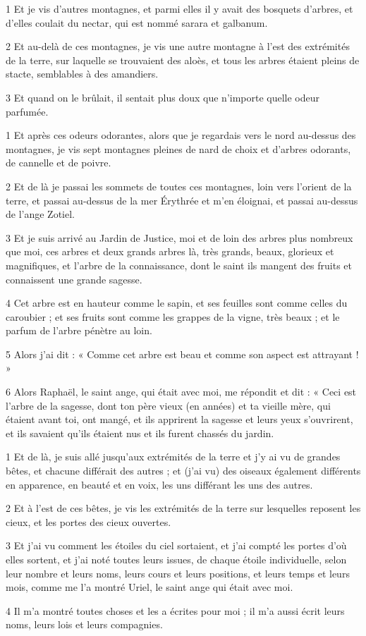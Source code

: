 
\par 1 Et je vis d'autres montagnes, et parmi elles il y avait des bosquets d'arbres, et d'elles coulait du nectar, qui est nommé sarara et galbanum.
\par 2 Et au-delà de ces montagnes, je vis une autre montagne à l'est des extrémités de la terre, sur laquelle se trouvaient des aloès, et tous les arbres étaient pleins de stacte, semblables à des amandiers.
\par 3 Et quand on le brûlait, il sentait plus doux que n'importe quelle odeur parfumée.


\par 1 Et après ces odeurs odorantes, alors que je regardais vers le nord au-dessus des montagnes, je vis sept montagnes pleines de nard de choix et d'arbres odorants, de cannelle et de poivre.
\par 2 Et de là je passai les sommets de toutes ces montagnes, loin vers l'orient de la terre, et passai au-dessus de la mer Érythrée et m'en éloignai, et passai au-dessus de l'ange Zotiel.
\par 3 Et je suis arrivé au Jardin de Justice, moi et de loin des arbres plus nombreux que moi, ces arbres et deux grands arbres là, très grands, beaux, glorieux et magnifiques, et l'arbre de la connaissance, dont le saint ils mangent des fruits et connaissent une grande sagesse.
\par 4 Cet arbre est en hauteur comme le sapin, et ses feuilles sont comme celles du caroubier ; et ses fruits sont comme les grappes de la vigne, très beaux ; et le parfum de l'arbre pénètre au loin.
\par 5 Alors j'ai dit : « Comme cet arbre est beau et comme son aspect est attrayant ! »
\par 6 Alors Raphaël, le saint ange, qui était avec moi, me répondit et dit : « Ceci est l'arbre de la sagesse, dont ton père vieux (en années) et ta vieille mère, qui étaient avant toi, ont mangé, et ils apprirent la sagesse et leurs yeux s'ouvrirent, et ils savaient qu'ils étaient nus et ils furent chassés du jardin.


\par 1 Et de là, je suis allé jusqu'aux extrémités de la terre et j'y ai vu de grandes bêtes, et chacune différait des autres ; et (j'ai vu) des oiseaux également différents en apparence, en beauté et en voix, les uns différant les uns des autres.
\par 2 Et à l'est de ces bêtes, je vis les extrémités de la terre sur lesquelles reposent les cieux, et les portes des cieux ouvertes.
\par 3 Et j'ai vu comment les étoiles du ciel sortaient, et j'ai compté les portes d'où elles sortent, et j'ai noté toutes leurs issues, de chaque étoile individuelle, selon leur nombre et leurs noms, leurs cours et leurs positions, et leurs temps et leurs mois, comme me l'a montré Uriel, le saint ange qui était avec moi.
\par 4 Il m'a montré toutes choses et les a écrites pour moi ; il m'a aussi écrit leurs noms, leurs lois et leurs compagnies.

